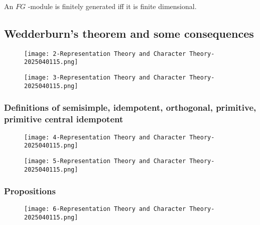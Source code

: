 An $FG$ -module is finitely generated iff it is finite dimensional.

\subsection{Wedderburn's theorem and some consequences}

\begin{figure}[H]
\centering
\texttt{[image: 2-Representation Theory and Character Theory-2025040115.png]}
\label{}
\end{figure}
\begin{figure}[H]
\centering
\texttt{[image: 3-Representation Theory and Character Theory-2025040115.png]}
\label{}
\end{figure}

\subsubsection{Definitions of semisimple, idempotent, orthogonal, primitive, primitive central idempotent}

\begin{figure}[H]
\centering
\texttt{[image: 4-Representation Theory and Character Theory-2025040115.png]}
\label{}
\end{figure}
\begin{figure}[H]
\centering
\texttt{[image: 5-Representation Theory and Character Theory-2025040115.png]}
\label{}
\end{figure}

\subsubsection{Propositions}

\begin{figure}[H]
\centering
\texttt{[image: 6-Representation Theory and Character Theory-2025040115.png]}
\label{}
\end{figure}
